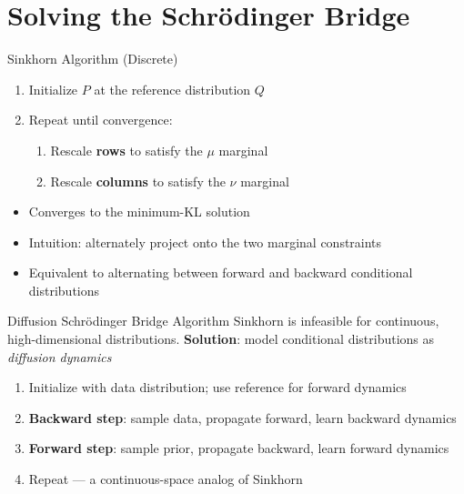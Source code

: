 \documentclass{beamer}
\begin{document}
\section{Solving the Schrödinger Bridge}

\begin{frame}{Sinkhorn Algorithm (Discrete)}
  \begin{enumerate}
    \item Initialize $P$ at the reference distribution $Q$
    \item Repeat until convergence:
    \begin{enumerate}
      \item Rescale \textbf{rows} to satisfy the $\mu$ marginal
      \item Rescale \textbf{columns} to satisfy the $\nu$ marginal
    \end{enumerate}
  \end{enumerate}
  \vspace{0.5em}
  \begin{itemize}
    \item Converges to the minimum-KL solution~\cite{Sinkhorn1964}
    \item Intuition: alternately project onto the two marginal constraints
    \item Equivalent to alternating between forward and backward conditional distributions
  \end{itemize}
\end{frame}

\begin{frame}{Diffusion Schrödinger Bridge Algorithm}
  Sinkhorn is infeasible for continuous, high-dimensional distributions.
  \textbf{Solution}: model conditional distributions as \emph{diffusion dynamics}~\cite{debortoli2023diffusionschrodingerbridgeapplications}
  \vspace{0.5em}
  \begin{enumerate}
    \item Initialize with data distribution; use reference for forward dynamics
    \item \textbf{Backward step}: sample data, propagate forward, learn backward dynamics
    \item \textbf{Forward step}: sample prior, propagate backward, learn forward dynamics
    \item Repeat — a continuous-space analog of Sinkhorn
  \end{enumerate}
\end{frame}
\end{document}

